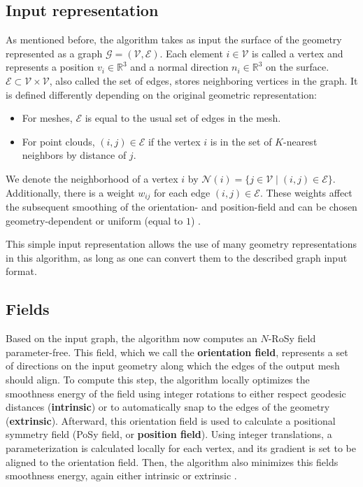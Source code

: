 \documentclass{ACGSeminar}
\begin{document}
\subsection{Input representation}
As mentioned before, the algorithm takes as input the surface of the geometry represented as a graph $\mathcal{G} = (\mathcal{V}, \mathcal{E})$. Each element $i \in \mathcal{V}$ is called a vertex and represents a position $v_i \in \mathbb{R}^3$ and a normal direction $n_i \in \mathbb{R}^3$ on the surface. $\mathcal{E} \subset \mathcal{V} \times \mathcal{V}$, also called the set of edges, stores neighboring vertices in the graph. It is defined differently depending on the original geometric representation:
\begin{itemize}
	\item	For meshes, $\mathcal{E}$ is equal to the usual set of edges in the mesh.
	\item	For point clouds, $(i,j) \in \mathcal{E}$ if the vertex $i$ is in the set of $K$-nearest neighbors by distance of $j$.
\end{itemize}
We denote the neighborhood of a vertex $i$ by $\mathcal{N}(i) = \{j \in \mathcal{V} \mid (i,j) \in \mathcal{E}\}$. Additionally, there is a weight $w_{ij}$ for each edge $(i,j) \in \mathcal{E}$. These weights affect the subsequent smoothing of the orientation- and position-field and can be chosen geometry-dependent or uniform (equal to $1$) \cite{jakob2015instant}.\bigskip

This simple input representation allows the use of many geometry representations in this algorithm, as long as one can convert them to the described graph input format.

\subsection{Fields}
Based on the input graph, the algorithm now computes an $N$-RoSy field parameter-free. This field, which we call the \textbf{orientation field}, represents a set of directions on the input geometry along which the edges of the output mesh should align. To compute this step, the algorithm locally optimizes the smoothness energy of the field using integer rotations to either respect geodesic distances (\textbf{intrinsic}) or to automatically snap to the edges of the geometry (\textbf{extrinsic}). Afterward, this orientation field is used to calculate a positional symmetry field (PoSy field, or \textbf{position field}). Using integer translations, a parameterization is calculated locally for each vertex, and its gradient is set to be aligned to the orientation field. Then, the algorithm also minimizes this fields smoothness energy, again either intrinsic or extrinsic \cite{jakob2015instant}.\bigskip
\end{document}
